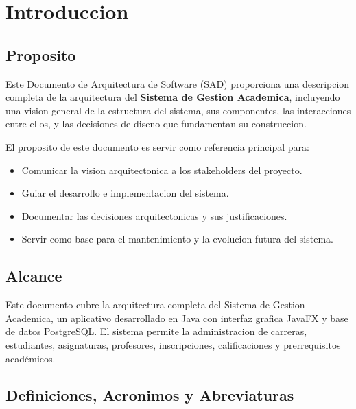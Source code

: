 \documentclass[12pt,a4paper]{article}
\begin{document}
\newpage
\tableofcontents
\listoffigures
\listoftables

\newpage
\section{Introduccion}

\subsection{Proposito}

Este Documento de Arquitectura de Software (SAD) proporciona una descripcion completa de la arquitectura del \textbf{Sistema de Gestion Academica}, incluyendo una vision general de la estructura del sistema, sus componentes, las interacciones entre ellos, y las decisiones de diseno que fundamentan su construccion.

El proposito de este documento es servir como referencia principal para:
\begin{itemize}
    \item Comunicar la vision arquitectonica a los stakeholders del proyecto.
    \item Guiar el desarrollo e implementacion del sistema.
    \item Documentar las decisiones arquitectonicas y sus justificaciones.
    \item Servir como base para el mantenimiento y la evolucion futura del sistema.
\end{itemize}

\subsection{Alcance}

Este documento cubre la arquitectura completa del Sistema de Gestion Academica, un aplicativo desarrollado en Java con interfaz grafica JavaFX y base de datos PostgreSQL. El sistema permite la administracion de carreras, estudiantes, asignaturas, profesores, inscripciones, calificaciones y prerrequisitos académicos.

\subsection{Definiciones, Acronimos y Abreviaturas}
\end{document}
